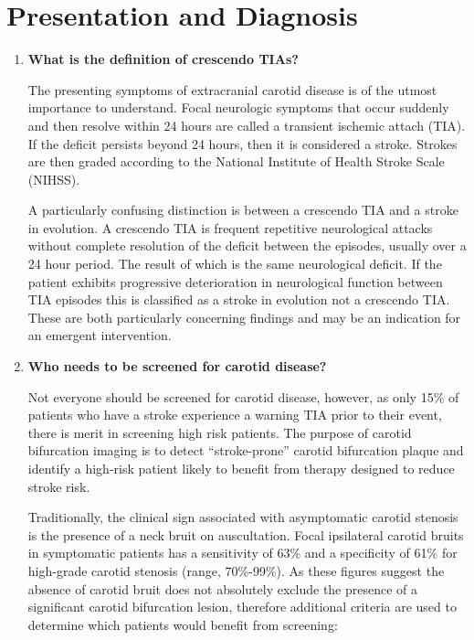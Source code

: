 \documentclass[
]{book}
\begin{document}
\hypertarget{presentation-and-diagnosis}{%
\section{Presentation and Diagnosis}\label{presentation-and-diagnosis}}

\begin{enumerate}
\def\labelenumi{\arabic{enumi}.}
\item
  \textbf{What is the definition of crescendo TIAs?}

  The presenting symptoms of extracranial carotid disease is of the
  utmost importance to understand. Focal neurologic symptoms that
  occur suddenly and then resolve within 24 hours are called a
  transient ischemic attach (TIA). If the deficit persists beyond 24
  hours, then it is considered a stroke. Strokes are then graded
  according to the National Institute of Health Stroke Scale
  (NIHSS).\citep{fischer2010}

  A particularly confusing distinction is between a crescendo TIA and
  a stroke in evolution. A crescendo TIA is frequent repetitive neurological
  attacks without complete resolution of the deficit between the
  episodes, usually over a 24 hour period. The result of which is the
  same neurological deficit. If the patient exhibits progressive
  deterioration in neurological function between TIA episodes this is
  classified as a stroke in evolution not a crescendo TIA.\citep{ricotta}
  These are both particularly concerning findings and may be an
  indication for an emergent intervention.
\item
  \textbf{Who needs to be screened for carotid disease?}

  Not everyone should be screened for carotid disease, however, as
  only 15\% of patients who have a stroke experience a warning TIA
  prior to their event, there is merit in screening high risk
  patients.\citep{rockman2019} The purpose of carotid bifurcation imaging
  is to detect ``stroke-prone'' carotid bifurcation plaque and identify
  a high-risk patient likely to benefit from therapy designed to
  reduce stroke risk.

  Traditionally, the clinical sign associated with asymptomatic
  carotid stenosis is the presence of a neck bruit on auscultation.
  Focal ipsilateral carotid bruits in symptomatic patients has a
  sensitivity of 63\% and a specificity of 61\% for high-grade carotid
  stenosis (range, 70\%-99\%). As these figures suggest the absence of
  carotid bruit does not absolutely exclude the presence of a
  significant carotid bifurcation lesion, therefore additional
  criteria are used to determine which patients would benefit from
  screening:


\end{enumerate}
\end{document}
